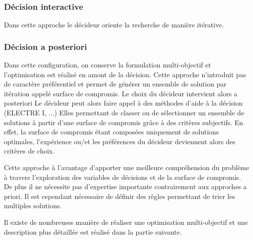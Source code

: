 

\subsubsection{Décision interactive} %
\label{ssub:decision_interactive}
Dans cette approche le décideur oriente la recherche de manière itérative.


\subsubsection{Décision a posteriori} %
\label{ssub:decision_a_posteriori}
Dans cette configuration, on conserve la formulation multi-objectif et l’optimisation
est réalisé en amont de la décision. Cette approche n’introduit pas de
caractère préférentiel et permet de générer un ensemble de solution par itération
appelé surface de compromis.
Le choix du décideur intervient alors a posteriori
Le décideur peut alors faire appel à des méthodes d’aide à la décision (ELECTRE I, ...)
Elles permettant de classer ou de sélectionner un ensemble de solutions
à partir d’une surface de compromis grâce à des critères subjectifs. En effet, la
surface de compromis étant composées uniquement de solutions optimales, l’expérience ou/et
les préférences du décideur deviennent alors des critères de choix.


Cette approche à l’avantage d’apporter une meilleure compréhension du problème à
travers l’exploration des variables de décisions et de la surface de compromis.
De plus il ne nécessite pas d’expertise importante contrairement aux approches a priori.
Il est cependant nécessaire de définir des règles permettant de trier les multiples solutions.

Il existe de nombreuses manière de réaliser une optimisation multi-objectif et une
description plus détaillée est réalisé dans la partie suivante.

